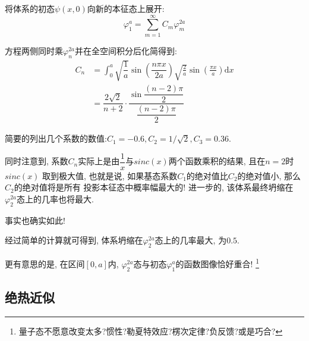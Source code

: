 \documentclass[a4paper, 11pt]{article}
\begin{document}
\begin{spacing}{1.2}
          将体系的初态$\psi(x, 0)$向新的本征态上展开:
          \begin{equation}
            \varphi_1^{a} = \sum_{m=1}^\infty{}C_m\varphi_m^{2a}
          \end{equation}
          
          方程两侧同时乘$\varphi^{2a}_n$并在全空间积分后化简得到:
          \begin{equation}
            \begin{aligned}
              C_n &= \int_0^a \sqrt{\dfrac{1}{a}}\sin(\dfrac{n\pi{}x}{2a})
                             \sqrt{\frac{2}{a}}\sin(\frac{\pi{}x}{a})
                             \mathrm{d}x\\
                  &= \dfrac{2\sqrt{2}}{n+2}\cdot\dfrac{\sin\dfrac{(n-2)\pi}{2}}{\dfrac{(n-2)\pi}{2}}
            \end{aligned}                           
          \end{equation}

          简要的列出几个系数的数值:$C_1 = -0.6, C_2 = 1/\sqrt{2}, C_3 = 0.36$. 

          同时注意到, 系数$C_n$实际上是由$\dfrac{1}{x}$与$sinc(x)$两个函数乘积的结果, 且在$n=2$时$sinc(x)$
          取到极大值, 也就是说, 如果基态系数$C_1$的绝对值比$C_2$的绝对值小, 那么$C_2$的绝对值将是所有
          投影本征态中概率幅最大的! 进一步的, 该体系最终坍缩在$\varphi_2^{2a}$态上的几率也将最大.

          事实也确实如此!

          经过简单的计算就可得到, 体系坍缩在$\varphi_2^{2a}$态上的几率最大, 为$0.5$.

          更有意思的是, 在区间$[0,a]$内, $\varphi_2^{2a}$态与初态$\varphi_1^{a}$的函数图像恰好重合!
          \footnote{量子态不愿意改变太多?惯性?勒夏特效应?楞次定律?负反馈?或是巧合?}

    \subsection{绝热近似} 

\end{spacing}
\end{document}
